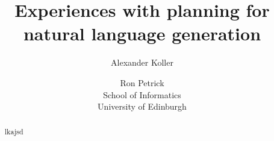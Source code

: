 \documentclass[letterpaper]{article}
\title{Experiences with planning for natural language generation}
\author{Alexander Koller \and Ron Petrick \\
School of Informatics \\
University of Edinburgh}
\begin{document}
\maketitle

\begin{abstract}
  lkajsd
\end{abstract}












\end{document}

